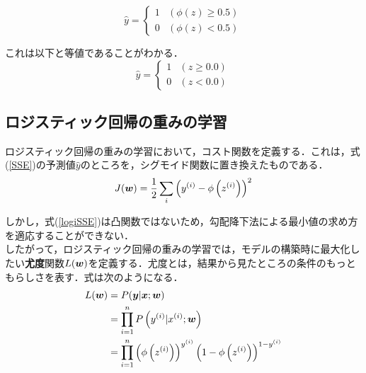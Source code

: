 \documentclass[a4j, 11pt]{jsarticle}
\numberwithin{equation}{section}
\newcommand{\mathbm}[1]{{\mbox{\boldmath $#1$}}}
\begin{document}
\begin{equation}
	\hat{y} =   
	\begin{cases}
		1 & (\phi(z) \geq 0.5)\\
		0 & (\phi(z) < 0.5)
	\end{cases}
\end{equation}

\indent これは以下と等値であることがわかる．\\
\begin{equation}
	\hat{y} =   
	\begin{cases}
		1 & (z \geq 0.0)\\
		0 & (z < 0.0)
	\end{cases}
\end{equation}

\subsection{ロジスティック回帰の重みの学習}
\indent ロジスティック回帰の重みの学習において，コスト関数を定義する．これは，式(\ref{SSE})の予測値$\hat{y}$のところを，シグモイド関数に置き換えたものである．
\begin{equation}
	J(\mathbm{w}) = \frac{1}{2}\sum_{i}\left(y^{(i)}-\phi\left(z^{(i)}\right)\right)^2
	\label{logiSSE}
 \end{equation}
 
\indent しかし，式(\ref{logiSSE})は凸関数ではないため，勾配降下法による最小値の求め方を適応することができない．\\
\indent したがって，ロジスティック回帰の重みの学習では，モデルの構築時に最大化したい\textbf{尤度}関数$L(\mathbm{w})$を定義する．尤度とは，結果から見たところの条件のもっともらしさを表す．式は次のようになる．\\
\begin{align}
	L(\mathbm{w}) &= P(\mathbm{y}|\mathbm{x};\mathbm{w})\nonumber\\
					&= \prod_{i=1}^{n}P\left(y^{(i)}|x^{(i)};\mathbm{w}\right)\nonumber\\
					&= \prod_{i=1}^{n}\left(\phi\left(z^{(i)}\right)\right)^{y^{(i)}}\left(1-\phi\left(z^{(i)}\right)\right)^{1-y^{(i)}}
	\label{logilike}
\end{align}
\end{document}
